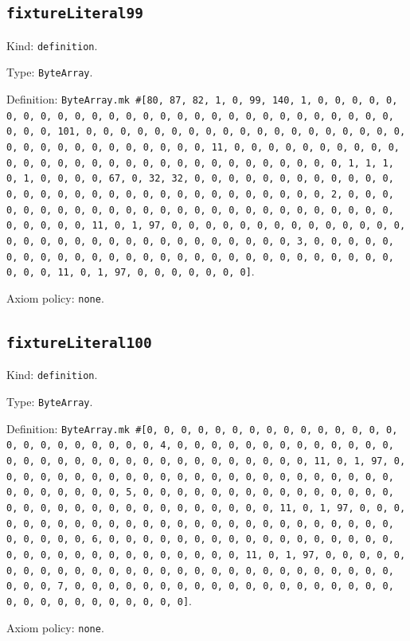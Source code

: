 \documentclass[11pt]{article}
\begin{document}
\subsection*{\texttt{fixtureLiteral99}}
\noindent Kind: \texttt{definition}.\par
\noindent Type: \texttt{ByteArray}.\par
\noindent Definition: \texttt{ByteArray.mk \#[80, 87, 82, 1, 0, 99, 140, 1, 0, 0, 0, 0, 0, 0, 0, 0, 0, 0, 0, 0, 0, 0, 0, 0, 0, 0, 0, 0, 0, 0, 0, 0, 0, 0, 0, 0, 0, 0, 0, 101, 0, 0, 0, 0, 0, 0, 0, 0, 0, 0, 0, 0, 0, 0, 0, 0, 0, 0, 0, 0, 0, 0, 0, 0, 0, 0, 0, 0, 0, 0, 0, 11, 0, 0, 0, 0, 0, 0, 0, 0, 0, 0, 0, 0, 0, 0, 0, 0, 0, 0, 0, 0, 0, 0, 0, 0, 0, 0, 0, 0, 0, 0, 1, 1, 1, 0, 1, 0, 0, 0, 0, 67, 0, 32, 32, 0, 0, 0, 0, 0, 0, 0, 0, 0, 0, 0, 0, 0, 0, 0, 0, 0, 0, 0, 0, 0, 0, 0, 0, 0, 0, 0, 0, 0, 0, 0, 2, 0, 0, 0, 0, 0, 0, 0, 0, 0, 0, 0, 0, 0, 0, 0, 0, 0, 0, 0, 0, 0, 0, 0, 0, 0, 0, 0, 0, 0, 0, 0, 11, 0, 1, 97, 0, 0, 0, 0, 0, 0, 0, 0, 0, 0, 0, 0, 0, 0, 0, 0, 0, 0, 0, 0, 0, 0, 0, 0, 0, 0, 0, 0, 0, 0, 0, 3, 0, 0, 0, 0, 0, 0, 0, 0, 0, 0, 0, 0, 0, 0, 0, 0, 0, 0, 0, 0, 0, 0, 0, 0, 0, 0, 0, 0, 0, 0, 0, 11, 0, 1, 97, 0, 0, 0, 0, 0, 0, 0]}.\par
\noindent Axiom policy: \texttt{none}.\par
\subsection*{\texttt{fixtureLiteral100}}
\noindent Kind: \texttt{definition}.\par
\noindent Type: \texttt{ByteArray}.\par
\noindent Definition: \texttt{ByteArray.mk \#[0, 0, 0, 0, 0, 0, 0, 0, 0, 0, 0, 0, 0, 0, 0, 0, 0, 0, 0, 0, 0, 0, 0, 0, 4, 0, 0, 0, 0, 0, 0, 0, 0, 0, 0, 0, 0, 0, 0, 0, 0, 0, 0, 0, 0, 0, 0, 0, 0, 0, 0, 0, 0, 0, 0, 0, 11, 0, 1, 97, 0, 0, 0, 0, 0, 0, 0, 0, 0, 0, 0, 0, 0, 0, 0, 0, 0, 0, 0, 0, 0, 0, 0, 0, 0, 0, 0, 0, 0, 0, 0, 5, 0, 0, 0, 0, 0, 0, 0, 0, 0, 0, 0, 0, 0, 0, 0, 0, 0, 0, 0, 0, 0, 0, 0, 0, 0, 0, 0, 0, 0, 0, 0, 11, 0, 1, 97, 0, 0, 0, 0, 0, 0, 0, 0, 0, 0, 0, 0, 0, 0, 0, 0, 0, 0, 0, 0, 0, 0, 0, 0, 0, 0, 0, 0, 0, 0, 0, 6, 0, 0, 0, 0, 0, 0, 0, 0, 0, 0, 0, 0, 0, 0, 0, 0, 0, 0, 0, 0, 0, 0, 0, 0, 0, 0, 0, 0, 0, 0, 0, 11, 0, 1, 97, 0, 0, 0, 0, 0, 0, 0, 0, 0, 0, 0, 0, 0, 0, 0, 0, 0, 0, 0, 0, 0, 0, 0, 0, 0, 0, 0, 0, 0, 0, 0, 7, 0, 0, 0, 0, 0, 0, 0, 0, 0, 0, 0, 0, 0, 0, 0, 0, 0, 0, 0, 0, 0, 0, 0, 0, 0, 0, 0, 0, 0, 0]}.\par
\noindent Axiom policy: \texttt{none}.\par
\end{document}

